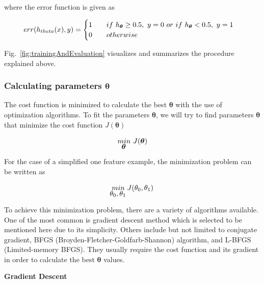 \begin{enumerate}
	where the error function is given as

	\begin{equation}{\label{eqn:misclassificationError}}
	  err(h_{theta}(x),y)=\begin{cases}
               1 \qquad if\ h_{{\bm{\theta}}}\geq0.5,\ y=0 \ or\ if \ h_{{\bm{\theta}}} < 0.5, \ y=1\\
               0 \qquad otherwise\\
            \end{cases}
	\end{equation} 

\end{enumerate}

Fig.~\ref{fig:trainingAndEvaluation} visualizes and summarizes the procedure explained above.

\subsubsection{Calculating parameters $\bm{\theta}$}

The cost function is minimized to calculate the best $\bm{\theta}$ with the use of optimization algorithms. To fit the parameters $\bm{\theta}$, we will try to find parameters $\bm{\theta}$ that minimize the cost function $J({\bm{\theta}})$

\begin{equation}{\label{eqn:optimizationGoal}}
\underaccent{{\displaystyle \bm{\theta}}}{min} \ J(\bm{\theta})
\end{equation} 

For the case of a simplified one feature example, the minimization problem can be written as

\begin{equation}{\label{eqn:optimizationGoalSimplified}}
\underaccent{{\displaystyle \theta_0, \theta_1}}{min} \ J(\theta_0,\theta_1)
\end{equation} 

To achieve this minimization problem, there are a variety of algorithms available. 
One of the most common is gradient descent method which is selected to be mentioned here due to its simplicity.  
Others include but not limited to conjugate gradient, BFGS (Broyden-Fletcher-Goldfarb-Shannon) algorithm, and L-BFGS (Limited-memory BFGS). 
They usually require the cost function and its gradient in order to calculate the best $\bm{\theta}$ values.

\textbf{Gradient Descent}

